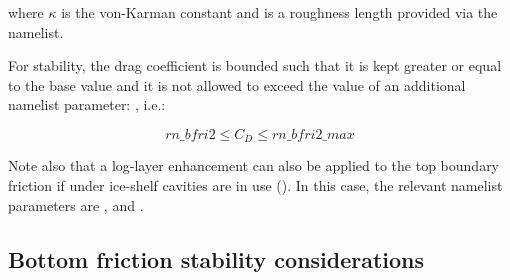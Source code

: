 \documentclass[../tex_main/NEMO_manual]{subfiles}
\begin{document}
\noindent where $\kappa$ is the von-Karman constant and  is a roughness
length provided via the namelist.

For stability, the drag coefficient is bounded such that it is kept greater or equal to
the base  value and it is not allowed to exceed the value of an additional
namelist parameter: , i.e.:

\begin{equation}
rn\_bfri2 \leq C_D \leq rn\_bfri2\_max
\end{equation}

\noindent Note also that a log-layer enhancement can also be applied to the top boundary
friction if under ice-shelf cavities are in use ().  In this case, the
relevant namelist parameters are , 
and .

\subsection{Bottom friction stability considerations}
\label{subsec:ZDF_bfr_stability}
\end{document}
